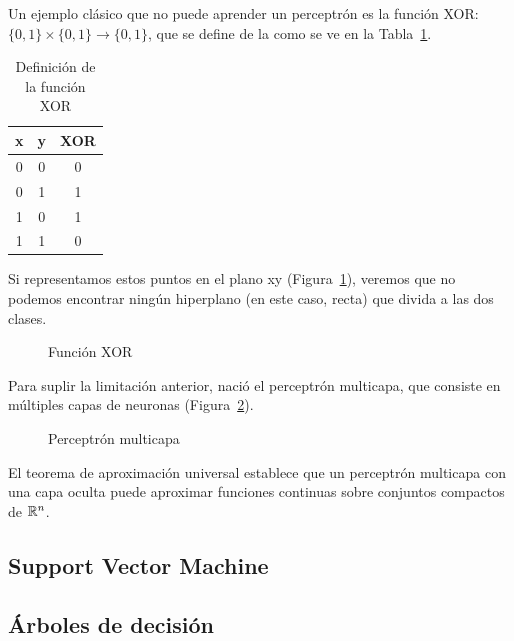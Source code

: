 Un ejemplo clásico que no puede aprender un perceptrón es la función XOR: $\{0,1\} \times \{0,1\} \to \{0,1\}$, que se define de la como se ve en la Tabla~\ref{tbl:xor}.\\


\begin{table}[htbp!]
	\centering
	\caption{Definición de la función XOR}
	\label{tbl:xor}
	\begin{tabular}{@{}ccc@{}}
		\toprule
		x & y & XOR \\ \midrule
		0 & 0 & 0   \\
		0 & 1 & 1   \\
		1 & 0 & 1   \\
		1 & 1 & 0   \\ \bottomrule
	\end{tabular}
\end{table}

Si representamos estos puntos en el plano xy (Figura~\ref{fig:xor}), veremos que no podemos encontrar ningún hiperplano (en este caso, recta) que divida a las dos clases.\\

\begin{figure}[htbp!]
	\label{fig:xor}
	\begin{center}
		\xor
	\end{center}
	\caption{Función XOR}
\end{figure}

Para suplir la limitación anterior, nació el perceptrón multicapa, que consiste en múltiples capas de neuronas (Figura~\ref{fig:perceptron_multicapa}).

\begin{figure}[htbp!]
	\label{fig:perceptron_multicapa}
	\begin{center}
		\perceptronmulticapa
	\end{center}
	\caption{Perceptrón multicapa}
\end{figure}

El teorema de aproximación universal establece que un perceptrón multicapa con una capa oculta puede aproximar funciones continuas sobre conjuntos compactos de $\mathbb{R}^n$.


\subsection{Support Vector Machine}

\subsection{Árboles de decisión}

